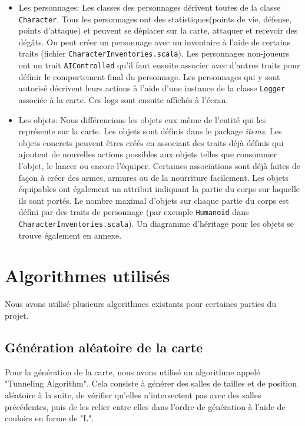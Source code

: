 \documentclass[10pt,a4paper]{article}
\begin{document}
\begin{itemize}
    \item Les personnages: Les classes des personnages dérivent toutes de la classe \texttt{Character}. Tous les personnages ont des statistiques(points de vie, défense, points d'attaque) et peuvent se déplacer sur la carte, attaquer et recevoir des dégâts. On peut créer un personnage avec un inventaire à l'aide de certains traits (fichier \texttt{CharacterInventories.scala}). Les personnages non-joueurs ont un trait \texttt{AIControlled} qu'il faut ensuite associer avec d'autres traits pour définir le comportement final du personnage. Les personnages qui y sont autorisé décrivent leurs actions à l'aide d'une instance de la classe \texttt{Logger} associée à la carte. Ces logs sont ensuite affichés à l'écran.
    \item Les objets: Nous différencions les objets eux même de l'entité qui les représente sur la carte. Les objets sont définis dans le package \emph{items}. Les objets concrets peuvent êtres créés en associant des traits déjà définis qui ajoutent de nouvelles actions possibles aux objets telles que consommer l'objet, le lancer ou encore l'équiper. Certaines associations sont déjà faites de façon à créer des armes, armures ou de la nourriture facilement. Les objets équipables ont également un attribut indiquant la partie du corps sur laquelle ils sont portés. Le nombre maximal d'objets sur chaque partie du corps est défini par des traits de personnage (par exemple \texttt{Humanoid} dans \texttt{CharacterInventories.scala}). Un diagramme d'héritage pour les objets se trouve également en annexe.
\end{itemize}

\section{Algorithmes utilisés}

Nous avons utilisé plusieurs algorithmes existants pour certaines parties du projet.

\subsection{Génération aléatoire de la carte}

Pour la génération de la carte, nous avons utilisé un algorithme appelé "Tunneling Algorithm". Cela consiste à générer des salles de tailles et de position aléatoire à la suite, de vérifier qu'elles n'intersectent pas avec des salles précédentes, puis de les relier entre elles dans l'ordre de génération à l'aide de couloirs en forme de "L".
\end{document}
